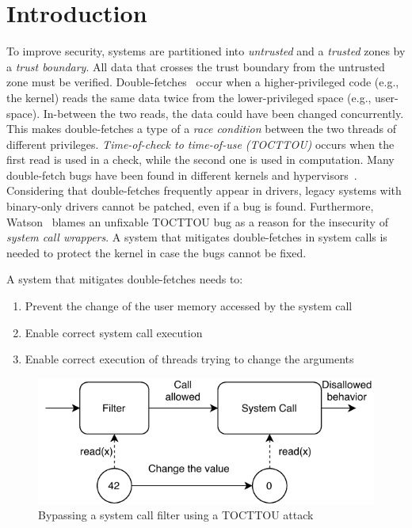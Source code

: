 \documentclass[conference]{IEEEtran}
\begin{document}
\section{Introduction}


To improve security, systems are partitioned into \emph{untrusted} and a
\emph{trusted} zones by a \emph{trust boundary}. All data that crosses the trust
boundary from the untrusted zone must be verified.
Double-fetches~\cite{serna08doublefetch, twizsgrakky07ring0, wilhelm2016xenpwn,
wang2018survey} occur when a higher-privileged code (e.g., the kernel) reads the
same data twice from the lower-privileged space (e.g., user-space). In-between
the two reads, the data could have been changed concurrently. This makes
double-fetches a type of a \emph{race condition} between the two threads of
different privileges. \emph{Time-of-check to time-of-use (TOCTTOU)} occurs when
the first read is used in a check, while the second one is used in computation.
Many double-fetch bugs have been found in different kernels and
hypervisors~\cite{cve201812633, cve202012652, cve20131332, cve201920610,
cve20158550, cve201610439, cve201610435, cve201610433, cve20195519,
cve20168438}. Considering that double-fetches frequently appear in drivers,
legacy systems with binary-only drivers cannot be patched, even if a bug is
found. Furthermore, Watson~\cite{watson2007} blames an unfixable TOCTTOU bug as
a reason for the insecurity of \emph{system call wrappers}. A system that
mitigates double-fetches in system calls is needed to protect the kernel in case
the bugs cannot be fixed.


A system that mitigates double-fetches needs to:
\begin{enumerate}
  \item Prevent the change of the user memory accessed by the system call
  \item Enable correct system call execution
  \item Enable correct execution of threads trying to change the arguments
\end{enumerate}


\begin{figure}[]
  \centering
  \includegraphics[width=.85\linewidth]{img/tocttou.pdf}
  \caption{Bypassing a system call filter using a TOCTTOU attack}
  \label{fig:tocttou}
\end{figure}
\end{document}
